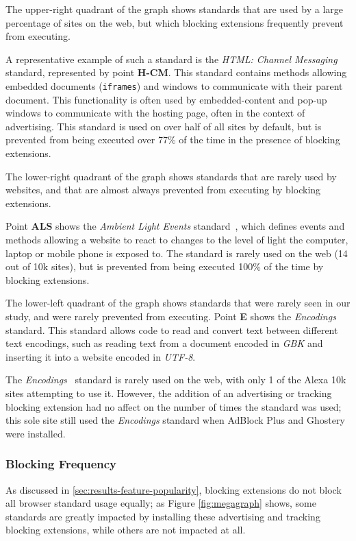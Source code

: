  The upper-right quadrant of the
graph shows standards that are used by a large percentage of sites on the web,
but which blocking extensions frequently prevent from executing.

A representative example of such a standard is the \textit{HTML: Channel
Messaging} ~\cite{htmlcmw3c} standard, represented by point \textbf{H-CM}.
This standard contains \JS methods allowing embedded documents
(\texttt{iframes}) and windows to communicate with their parent document.  This
functionality is often used by embedded-content and pop-up windows to
communicate with the hosting page, often in the context of advertising.  This
standard is used on over half of all sites by default, but is prevented from
being executed over 77\% of the time in the presence of blocking extensions.

 The lower-right quadrant of the
graph shows standards that are rarely used by websites, and that are almost
always prevented from executing by blocking extensions.

Point \textbf{ALS} shows the \emph{Ambient Light Events}
standard~\cite{ambientlightapi}, which defines events and methods allowing a
website to react to changes to the level of light the computer, laptop or
mobile phone is exposed to.  The standard is rarely used on the web (14 out of
10k sites), but is prevented from being executed 100\% of the time by blocking
extensions.

 The lower-left quadrant of
the graph shows standards that were rarely seen in our study, and were rarely
prevented from executing.  Point \textbf{E} shows the
\emph{Encodings}~\cite{encodingw3c} standard.  This standard allows \JS code to
read and convert text between different text encodings, such as reading text
from a document encoded in \emph{GBK} and inserting it into a website encoded
in \emph{UTF-8}.

The \emph{Encodings}~\cite{encodingw3c} standard is rarely used on the web,
with only 1 of the Alexa 10k sites attempting to use it.  However, the addition
of an advertising or tracking blocking extension had no affect on the number of
times the standard was used; this sole site still used the \emph{Encodings}
standard when AdBlock Plus and Ghostery were installed.


\subsubsection{Blocking Frequency}
As discussed in \ref{sec:results-feature-popularity}, blocking extensions do
not block all browser standard usage equally; as Figure \ref{fig:megagraph}
shows, some standards are greatly impacted by installing these advertising and
tracking blocking extensions, while others are not impacted at all.

